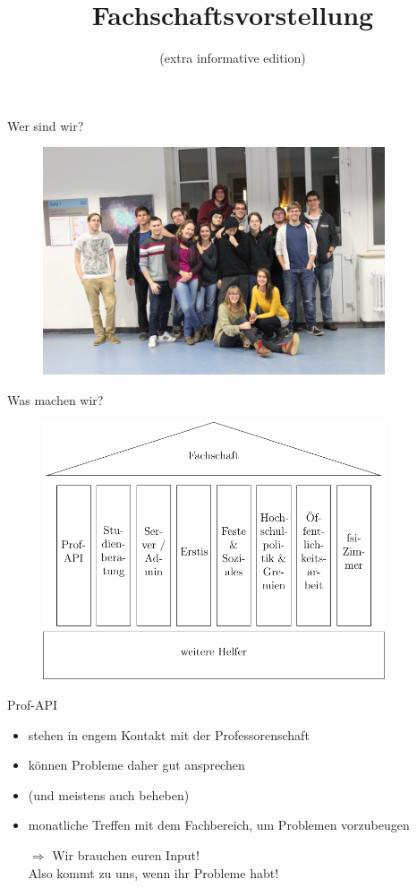 \documentclass{beamer}
\title{Fachschaftsvorstellung}
\subtitle{(extra informative edition)}
\begin{document}
	\maketitle
	
	\begin{frame}{Wer sind wir?}
		\begin{figure}
			\includegraphics[width=0.9\textwidth]{pictures/fachschaft.jpg}
		\end{figure}
	\end{frame}
	
	\begin{frame}{Was machen wir?}
		\begin{figure}
			\includegraphics[width=0.9\textwidth]{pictures/selbstverstaendnis.pdf}
		\end{figure}
	\end{frame}
 	
	\begin{frame}{Prof-API}
		\begin{itemize}
			\item stehen in engem Kontakt mit der Professorenschaft
			\item können Probleme daher gut ansprechen
			\item (und meistens auch beheben)
			\item monatliche Treffen mit dem Fachbereich, um Problemen vorzubeugen
			\item[$\Rightarrow$] Wir brauchen euren Input!\\Also kommt zu uns, wenn ihr Probleme habt!
		\end{itemize}
	\end{frame}
	
\end{document}
